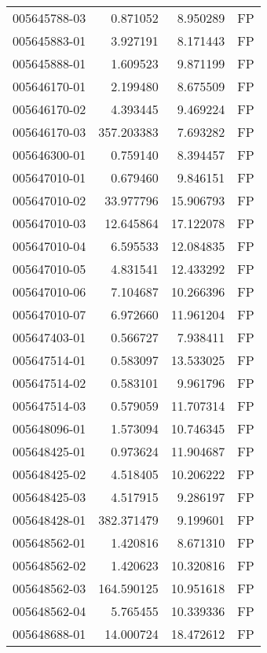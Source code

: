\begin{tabular}{lrrl}
005645788-03 &    0.871052 &       8.950289 &   FP \\
005645883-01 &    3.927191 &       8.171443 &   FP \\
005645888-01 &    1.609523 &       9.871199 &   FP \\
005646170-01 &    2.199480 &       8.675509 &   FP \\
005646170-02 &    4.393445 &       9.469224 &   FP \\
005646170-03 &  357.203383 &       7.693282 &   FP \\
005646300-01 &    0.759140 &       8.394457 &   FP \\
005647010-01 &    0.679460 &       9.846151 &   FP \\
005647010-02 &   33.977796 &      15.906793 &   FP \\
005647010-03 &   12.645864 &      17.122078 &   FP \\
005647010-04 &    6.595533 &      12.084835 &   FP \\
005647010-05 &    4.831541 &      12.433292 &   FP \\
005647010-06 &    7.104687 &      10.266396 &   FP \\
005647010-07 &    6.972660 &      11.961204 &   FP \\
005647403-01 &    0.566727 &       7.938411 &   FP \\
005647514-01 &    0.583097 &      13.533025 &   FP \\
005647514-02 &    0.583101 &       9.961796 &   FP \\
005647514-03 &    0.579059 &      11.707314 &   FP \\
005648096-01 &    1.573094 &      10.746345 &   FP \\
005648425-01 &    0.973624 &      11.904687 &   FP \\
005648425-02 &    4.518405 &      10.206222 &   FP \\
005648425-03 &    4.517915 &       9.286197 &   FP \\
005648428-01 &  382.371479 &       9.199601 &   FP \\
005648562-01 &    1.420816 &       8.671310 &   FP \\
005648562-02 &    1.420623 &      10.320816 &   FP \\
005648562-03 &  164.590125 &      10.951618 &   FP \\
005648562-04 &    5.765455 &      10.339336 &   FP \\
005648688-01 &   14.000724 &      18.472612 &   FP \\

\end{tabular}
